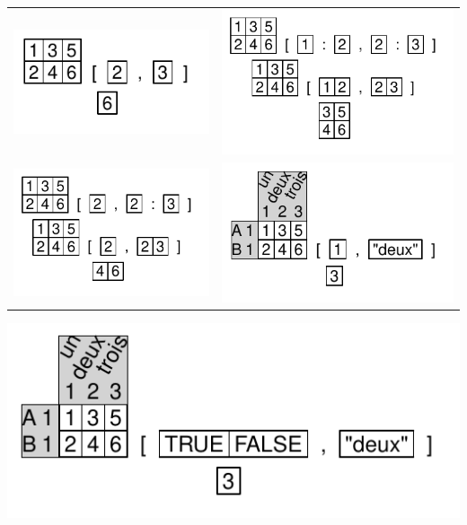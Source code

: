 \documentclass[pdflatex]{article}
\begin{document}
\begin{tabular}{cc}
\includegraphics{matrix_extraction} & \includegraphics{matrix_extraction3}\\
\includegraphics{matrix_extraction2} & \includegraphics{matrix_extraction4}\\
\end{tabular}

\includegraphics{matrix_extraction5}
\end{document}
